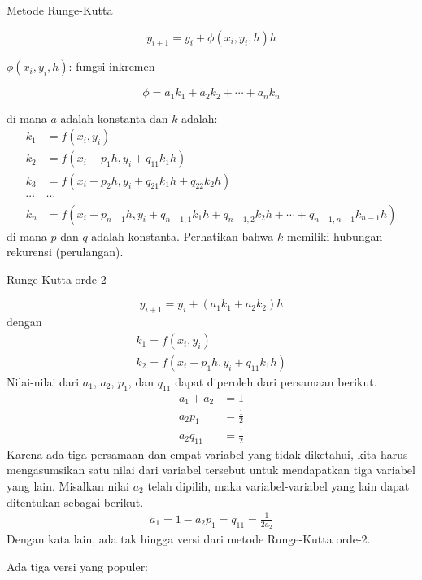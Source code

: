 Metode Runge-Kutta

\begin{equation*}
y_{i+1} = y_{i} + \phi(x_i, y_i, h) h
\end{equation*}

$\phi(x_i, y_i, h)$: fungsi inkremen

\begin{equation*}
\phi = a_1 k_1 + a_2 k_2 + \cdots + a_n k_n
\end{equation*}

di mana $a$ adalah konstanta dan $k$ adalah:
\begin{align*}
k_1 & = f(x_i, y_i) \\
k_2 & = f(x_i + p_1 h, y_i + q_{11} k_1 h ) \\
k_3 & = f(x_i + p_2 h, y_i + q_{21} k_1 h + q_{22} k_2 h) \\
\cdots & \cdots \\
k_n & = f(x_i + p_{n-1}h, y_i + q_{n-1,1} k_1 h + q_{n-1,2} k_2 h + \cdots + q_{n-1,n-1} k_{n-1} h)
\end{align*}
di mana $p$ dan $q$ adalah konstanta.
Perhatikan bahwa $k$ memiliki hubungan rekurensi (perulangan).

Runge-Kutta orde 2

\begin{equation*}
y_{i+1} = y_i + (a_1 k_1 + a_2 k_2) h
\end{equation*}
dengan
\begin{align*}
k_1 = f(x_i, y_i) \\
k_2 = f(x_i + p_1 h, y_i + q_{11} k_1 h)
\end{align*}
Nilai-nilai dari $a_1$, $a_2$, $p_1$, dan $q_{11}$ dapat diperoleh dari persamaan
berikut.
\begin{align*}
a_1 + a_2  & = 1 \\
a_2 p_1    & = \frac{1}{2} \\
a_2 q_{11} & = \frac{1}{2}
\end{align*}
Karena ada tiga persamaan dan empat variabel yang tidak diketahui, kita harus mengasumsikan satu
nilai dari variabel tersebut untuk mendapatkan tiga variabel yang lain.
Misalkan nilai $a_2$ telah dipilih, maka variabel-variabel yang lain
dapat ditentukan sebagai berikut.
\begin{align*}
a_1 = 1 - a_2
p_1 = q_{11} = \frac{1}{2a_2}
\end{align*}
Dengan kata lain, ada tak hingga versi dari metode Runge-Kutta orde-2.

Ada tiga versi yang populer:

